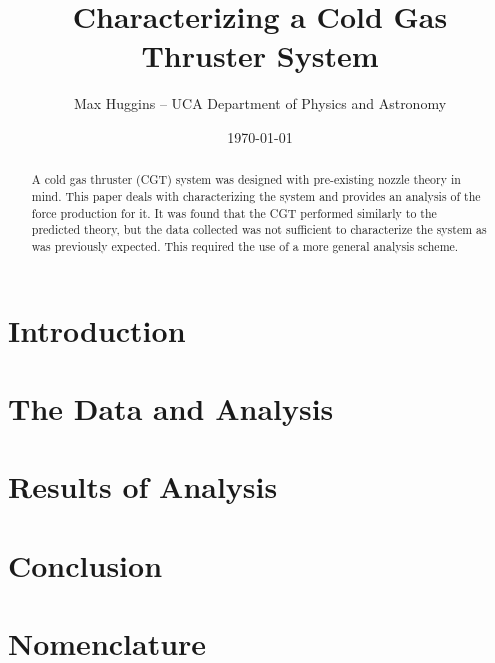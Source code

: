 \documentclass[letterpaper,12pt]{article}
\begin{document}
\title{Characterizing a Cold Gas Thruster System}
\author{Max Huggins – UCA Department of Physics and Astronomy}
\date{\today}
\maketitle


\begin{abstract}
A cold gas thruster (CGT) system was designed with pre-existing nozzle theory in mind. This paper deals with characterizing the system and provides an analysis of the force production for it. It was found that the CGT performed similarly to the predicted theory, but the data collected was not sufficient to characterize the system as was previously expected. This required the use of a more general analysis scheme.
\end{abstract}


\section{Introduction}


\section{The Data and Analysis}




\section{Results of Analysis}




\section{Conclusion}




\section{Nomenclature}\label{nomenclature}
\printnomenclature



\end{document}
